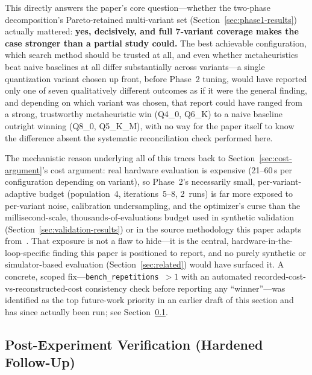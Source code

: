 \documentclass[journal]{IEEEtran}
\begin{document}
This directly answers the paper's core question---whether the two-phase decomposition's Pareto-retained multi-variant set (Section~\ref{sec:phase1-results}) actually mattered: \textbf{yes, decisively, and full 7-variant coverage makes the case stronger than a partial study could.} The best achievable configuration, which search method should be trusted at all, and even whether metaheuristics beat naive baselines at all differ substantially across variants---a single quantization variant chosen up front, before Phase~2 tuning, would have reported only one of seven qualitatively different outcomes as if it were the general finding, and depending on which variant was chosen, that report could have ranged from a strong, trustworthy metaheuristic win (Q4\_0, Q6\_K) to a naive baseline outright winning (Q8\_0, Q5\_K\_M), with no way for the paper itself to know the difference absent the systematic reconciliation check performed here.

The mechanistic reason underlying all of this traces back to Section~\ref{sec:cost-argument}'s cost argument: real hardware evaluation is expensive (21--60\,s per configuration depending on variant), so Phase~2's necessarily small, per-variant-adaptive budget (population~4, iterations~5--8, 2~runs) is far more exposed to per-variant noise, calibration undersampling, and the optimizer's curse than the millisecond-scale, thousands-of-evaluations budget used in synthetic validation (Section~\ref{sec:validation-results}) or in the source methodology this paper adapts from~\cite{ref11}. That exposure is not a flaw to hide---it is the central, hardware-in-the-loop-specific finding this paper is positioned to report, and no purely synthetic or simulator-based evaluation (Section~\ref{sec:related}) would have surfaced it. A concrete, scoped fix---\texttt{bench\_repetitions}~$>1$ with an automated recorded-cost-vs-reconstructed-cost consistency check before reporting any ``winner''---was identified as the top future-work priority in an earlier draft of this section and has since actually been run; see Section~\ref{sec:hardened-followup}.

\subsection{Post-Experiment Verification (Hardened Follow-Up)}
\label{sec:hardened-followup}
\end{document}
